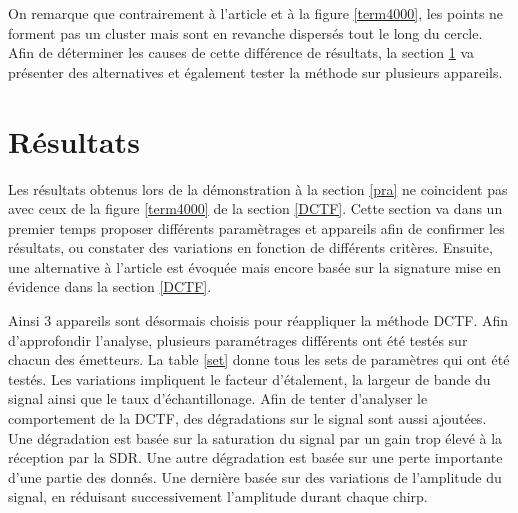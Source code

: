 On remarque que contrairement à l'article et à la figure \ref{term4000}, les points ne forment pas un cluster mais sont en revanche dispersés tout le long du cercle. Afin de déterminer les causes de cette différence de résultats, la section \ref{result} va présenter des alternatives et également tester la méthode sur plusieurs appareils.

\section{Résultats}\label{result}

Les résultats obtenus lors de la démonstration à la section  \ref{pra} ne coincident pas avec ceux de la figure \ref{term4000} de la section \ref{DCTF}. Cette section va dans un premier temps proposer différents paramètrages et appareils afin de confirmer les résultats, ou constater des variations en fonction de différents critères. Ensuite, une alternative à l'article est évoquée mais encore basée sur la signature mise en évidence dans la section \ref{DCTF}. 

Ainsi 3 appareils sont désormais choisis pour réappliquer la méthode DCTF. Afin d'approfondir l'analyse, plusieurs paramétrages différents ont été testés sur chacun des émetteurs. La table \ref{set} donne tous les sets de paramètres qui ont été testés. Les variations impliquent le facteur d'étalement, la largeur de bande du signal ainsi que le taux d'échantillonage. Afin de tenter d'analyser le comportement de la \ac{DCTF}, des dégradations sur le signal sont aussi ajoutées. Une dégradation est basée sur la saturation du signal par un gain trop élevé à la réception par la \ac{SDR}. Une autre dégradation est basée sur une perte importante d'une partie des donnés. Une dernière basée sur des variations  de l'amplitude du signal, en réduisant successivement l'amplitude durant chaque chirp.

